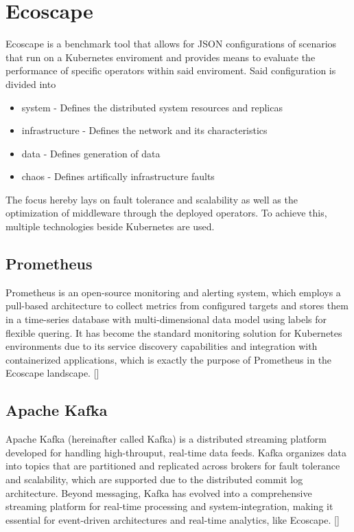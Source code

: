 \section{Ecoscape}
Ecoscape is a benchmark tool that allows for JSON configurations of scenarios that run on a Kubernetes enviroment and provides means to evaluate the performance of specific operators within said enviroment.
Said configuration is divided into 
\begin{itemize}
  \item system - Defines the distributed system resources and replicas
  \item infrastructure - Defines the network and its characteristics
  \item data - Defines generation of data
  \item chaos -  Defines artifically infrastructure faults
\end{itemize}
The focus hereby lays on fault tolerance and scalability as well as the optimization of middleware through the deployed operators.
To achieve this, multiple technologies beside Kubernetes are used.

\subsection{Prometheus}
Prometheus is an open-source monitoring and alerting system, which employs a pull-based architecture to collect metrics from configured targets and stores them in a time-series database with multi-dimensional data model using labels for flexible quering.
It has become the standard monitoring solution for Kubernetes environments due to its service discovery capabilities and integration with containerized applications, which is exactly the purpose of Prometheus in the Ecoscape landscape. [\cite{prometheus2024}]
\subsection{Apache Kafka}
Apache Kafka (hereinafter called Kafka) is a distributed streaming platform developed for handling high-throuput, real-time data feeds. Kafka organizes data into topics that are partitioned and replicated across brokers for fault tolerance and scalability, which are supported due to the distributed commit log architecture.
Beyond messaging, Kafka has evolved into a comprehensive streaming platform for real-time processing and system-integration, making it essential for event-driven architectures and real-time analytics, like Ecoscape. [\cite{kafka2024}]
